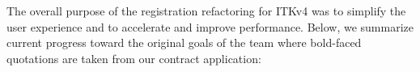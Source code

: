 \documentclass{frontiersSCNS}
\newcommand{\R}{{\bf R}}
\newcommand{\x}{{\bf x}}
\newcommand{\y}{{\bf y}}
\newcommand{\image}[1]{#1}
\newcommand{\I}{\image{I}}
\newcommand{\J}{\image{J}}
\newcommand{\Id}{\text{Id}}
\begin{document}

The overall purpose of the registration refactoring for ITKv4 was to simplify the user experience and to accelerate and improve performance. Below, we summarize current progress toward the original goals of the team where bold-faced quotations are taken from our contract application:
\end{document}
